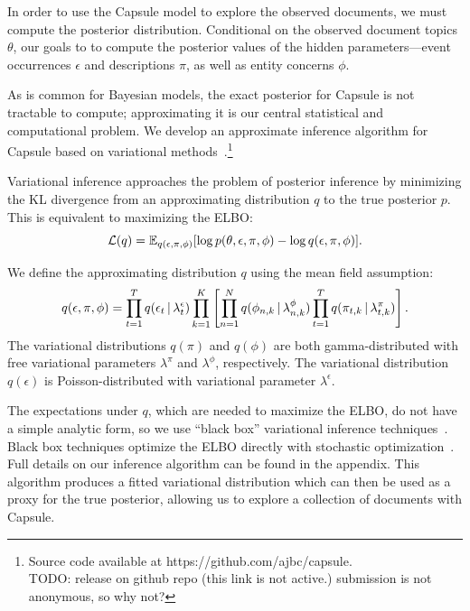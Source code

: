 In order to use the Capsule model to explore the observed documents, we must compute the posterior distribution.  Conditional on the observed document topics $\theta$, our goals to to compute the posterior values of the hidden parameters---event occurrences $\epsilon$ and descriptions $\pi$, as well as entity concerns $\phi$.

As is common for Bayesian models, the exact posterior for Capsule is not tractable to compute; approximating it is our central statistical and computational problem.  We develop an approximate inference algorithm for Capsule based on variational methods~\cite{Wainwright:2008}.\footnote{Source code available at https://github.com/ajbc/capsule.\\ TODO: release on github repo (this link is not active.)  submission is not anonymous, so why not?}

Variational inference approaches the problem of posterior inference by minimizing the KL divergence from an approximating distribution $q$ to the true posterior $p$.
This is equivalent to maximizing the ELBO: 
\begin{equation}
\mathcal{L}(q)  = \mathbb{E}_{q(\epsilon, \pi, \phi)}[\log p(\theta,\epsilon,\pi,\phi) - \log q(\epsilon, \pi, \phi)].
\label{eq:elbo}
\end{equation}

We define the approximating distribution $q$ using the mean field assumption:
\begin{equation}
q(\epsilon, \pi, \phi) = \prod_{t=1}^T q(\epsilon_{t} \, | \, \lambda^\epsilon_t)\prod_{k=1}^K\left[\prod_{n=1}^N q(\phi_{n,k} \, | \, \lambda^\phi_{n,k})\prod_{t=1}^T q(\pi_{t,k} \, | \, \lambda^\pi_{t,k})\right].
\label{eq:q}
\end{equation}
The variational distributions $q(\pi)$ and $q(\phi)$ are both gamma-distributed with free variational parameters $\lambda^\pi$ and $\lambda^\phi$, respectively. The variational distribution $q(\epsilon)$ is Poisson-distributed with variational parameter $\lambda^\epsilon$.

The expectations under $q$, which are needed to maximize the ELBO, do not have a simple analytic form, so we use ``black box'' variational inference techniques~\cite{Ranganath:2014}.  Black box techniques optimize the ELBO directly with stochastic optimization~\cite{Robbins:1951}.  Full details on our inference algorithm can be found in the appendix.  This algorithm produces a fitted variational distribution which can then be used as a proxy for the true posterior, allowing us to explore a collection of documents with Capsule.  

